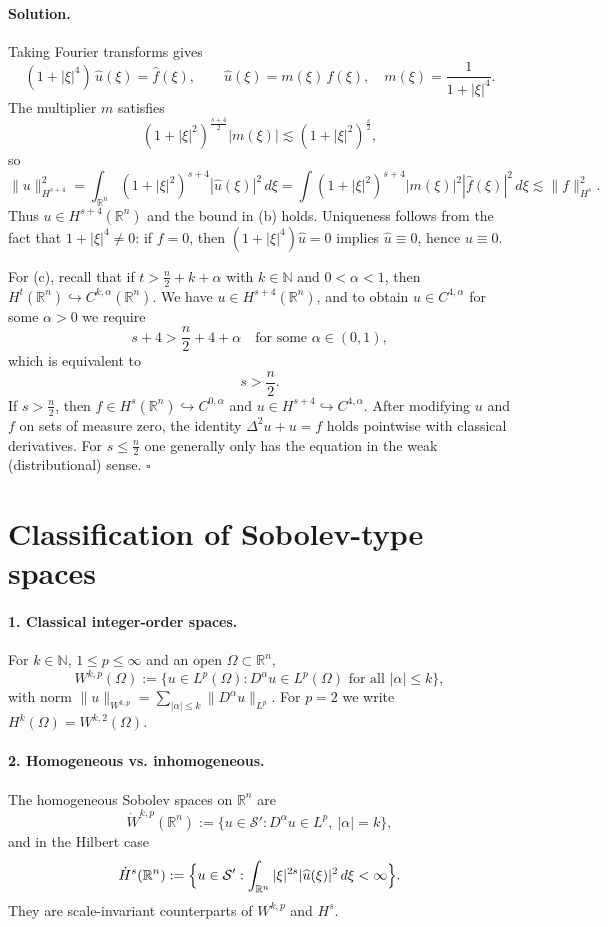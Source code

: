 \documentclass[12pt,a4paper]{article}
\newcommand{\qed}{\hfill$\square$}
\theoremstyle{plain}
\theoremstyle{definition}
\theoremstyle{remark}
\theoremstyle{remark}
\begin{document}
\paragraph{Solution.}
Taking Fourier transforms gives
\[
(1+|\xi|^4)\,\widehat u(\xi) = \widehat f(\xi), \qquad
\widehat u(\xi) = m(\xi)\,\widehat f(\xi), \quad m(\xi)=\frac{1}{1+|\xi|^4}.
\]
The multiplier $m$ satisfies
\[
(1+|\xi|^2)^{\frac{s+4}{2}} |m(\xi)|
\lesssim (1+|\xi|^2)^{\frac{s}{2}},
\]
so
\[
\|u\|_{H^{s+4}}^2
= \int_{\mathbb R^n} (1+|\xi|^2)^{s+4} |\widehat u(\xi)|^2 \,d\xi
= \int (1+|\xi|^2)^{s+4} |m(\xi)|^2 |\widehat f(\xi)|^2\,d\xi
\lesssim \|f\|_{H^s}^2.
\]
Thus $u\in H^{s+4}(\mathbb R^n)$ and the bound in (b) holds.
Uniqueness follows from the fact that $1+|\xi|^4\neq 0$:
if $f=0$, then $(1+|\xi|^4)\widehat u=0$ implies $\widehat u\equiv 0$, hence $u\equiv 0$.

\medskip

For (c), recall that if $t> \frac n2 + k + \alpha$ with $k\in\mathbb N$ and $0<\alpha<1$,
then $H^t(\mathbb R^n)\hookrightarrow C^{k,\alpha}(\mathbb R^n)$.
We have $u\in H^{s+4}(\mathbb R^n)$, and to obtain $u\in C^{4,\alpha}$ for some $\alpha>0$
we require
\[
s+4 > \frac n2 + 4 + \alpha
\quad\text{for some } \alpha\in(0,1),
\]
which is equivalent to
\[
s > \frac n2.
\]
If $s>\frac n2$, then $f\in H^s(\mathbb R^n)\hookrightarrow C^{0,\alpha}$ and
$u\in H^{s+4}\hookrightarrow C^{4,\alpha}$.
After modifying $u$ and $f$ on sets of measure zero, the identity
$\Delta^2 u + u = f$ holds pointwise with classical derivatives.
For $s\le \frac n2$ one generally only has the equation in the weak (distributional) sense.
\qed

\section*{Classification of Sobolev-type spaces}

\paragraph{1. Classical integer-order spaces.}
For $k\in\mathbb N$, $1\le p\le\infty$ and an open $\Omega\subset\mathbb R^n$,
\[
W^{k,p}(\Omega)
:= \{u\in L^p(\Omega): D^\alpha u\in L^p(\Omega)\text{ for all }|\alpha|\le k\},
\]
with norm $\|u\|_{W^{k,p}}=\sum_{|\alpha|\le k}\|D^\alpha u\|_{L^p}$.
For $p=2$ we write $H^k(\Omega)=W^{k,2}(\Omega)$.

\medskip

\paragraph{2. Homogeneous vs. inhomogeneous.}
The homogeneous Sobolev spaces on $\mathbb R^n$ are
\[
\dot W^{k,p}(\mathbb R^n)
:= \{u\in\mathcal S' : D^\alpha u\in L^p,\ |\alpha|=k\},
\]
and in the Hilbert case
\[
\dot H^s(\mathbb R^n)
:= \Bigl\{u\in\mathcal S' : \int_{\mathbb R^n}|\xi|^{2s}|\widehat u(\xi)|^2\,d\xi<\infty\Bigr\}.
\]
They are scale-invariant counterparts of $W^{k,p}$ and $H^s$.
\end{document}

